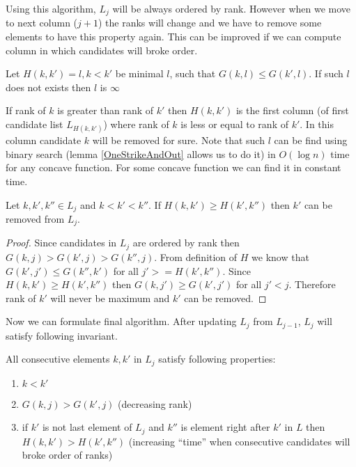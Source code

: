 Using this algorithm, $L_j$ will be always ordered by rank. However when we move
to next column ($j+1$) the ranks will change and we have to remove some elements 
to have this property again. This can be improved if we can compute column in
which  candidates will broke order.

\begin{definition}
Let $H(k,k')=l, k<k'$ be minimal $l$, such that $G(k,l)\leq G(k',l)$. If such $l$ does
not exists then $l$ is $\infty$ 
\end{definition}

If rank of $k$ is greater than rank of $k'$ then $H(k,k')$ is the first column
(of first candidate list $L_{H(k,k')}$) where rank of $k$ is less or equal to
rank of $k'$. In this column candidate $k$ will be removed for sure.  Note that
such $l$ can be find using binary search (lemma \ref{OneStrikeAndOut} allows us
to do it) in $O(\log n)$ time for any concave function. For some concave
function we can find it in constant time.

\begin{lemma}\label{TimeLemma}
Let $k,k',k''\in L_j$ and $k<k'<k''$. If $H(k,k')\geq H(k',k'')$ then $k'$ can be
removed from $L_j$.
\end{lemma}

\begin{proof}
Since candidates in $L_j$ are ordered by rank then $G(k,j)>G(k',j)>G(k'',j)$.
From definition of $H$ we know that 
$G(k',j')\leq G(k'',k')$ for  all $j'>=H(k',k'')$. Since
$H(k,k')\geq H(k',k'')$ then $G(k,j')\geq G(k',j')$ for all $j'<j$. Therefore rank
of $k'$ will never be maximum and $k'$ can be removed.

\end{proof}

Now we can formulate final algorithm. After updating $L_j$ from $L_{j-1}$,
$L_j$ will satisfy following invariant.
\begin{invariant}\label{LogGapInvariant}
All consecutive elements $k,k'$ in $L_j$ satisfy following properties:
\begin{enumerate}
\item $k<k'$
\item $G(k,j)>G(k',j)$ (decreasing rank)
\item if $k'$ is not last element of $L_j$ and $k''$ is element right after $k'$
in $L$ then $H(k,k')> H(k',k'')$ (increasing ``time'' when consecutive
candidates will broke order of ranks)
\end{enumerate}
\end{invariant}

